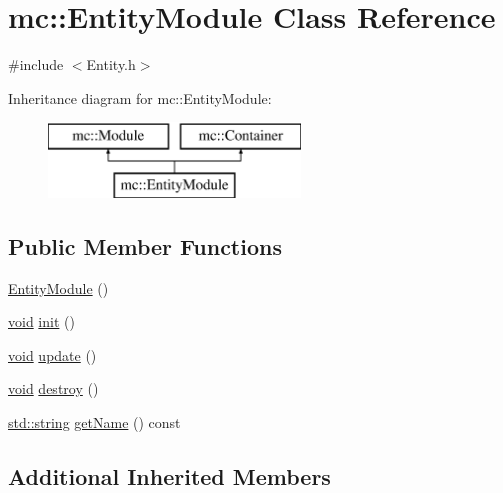 \hypertarget{classmc_1_1_entity_module}{}\section{mc\+:\+:Entity\+Module Class Reference}
\label{classmc_1_1_entity_module}


{\ttfamily \#include $<$Entity.\+h$>$}

Inheritance diagram for mc\+:\+:Entity\+Module\+:\begin{figure}[H]
\begin{center}
\leavevmode
\includegraphics[height=2.000000cm]{classmc_1_1_entity_module}
\end{center}
\end{figure}
\subsection*{Public Member Functions}
\begin{DoxyCompactItemize}
\item 
\hyperlink{classmc_1_1_entity_module_a38694a974571e19a231b4a62427259cf}{Entity\+Module} ()
\item 
\hyperlink{_s_d_l__opengles2__gl2ext_8h_ae5d8fa23ad07c48bb609509eae494c95}{void} \hyperlink{classmc_1_1_entity_module_a5e1f25e0d12c50f6e8d8fbdf31028b8e}{init} ()
\item 
\hyperlink{_s_d_l__opengles2__gl2ext_8h_ae5d8fa23ad07c48bb609509eae494c95}{void} \hyperlink{classmc_1_1_entity_module_a3307eb2ce5af81b6a6e26fdaa12e3063}{update} ()
\item 
\hyperlink{_s_d_l__opengles2__gl2ext_8h_ae5d8fa23ad07c48bb609509eae494c95}{void} \hyperlink{classmc_1_1_entity_module_a6c0fe0216850bb703df6721940f78b5f}{destroy} ()
\item 
\hyperlink{_s_d_l__opengl__glext_8h_ae84541b4f3d8e1ea24ec0f466a8c568b}{std\+::string} \hyperlink{classmc_1_1_entity_module_aa943b1cfb590b01ce6f8a2d749a505bd}{get\+Name} () const 
\end{DoxyCompactItemize}
\subsection*{Additional Inherited Members}


